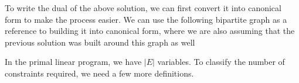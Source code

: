 \documentclass[addpoints]{exam}
\newcommand{\abs}[1]{\left| #1\right|}
\begin{document}
\begin{questions}
\begin{parts}
\begin{solution}
To write the dual of the above solution, we can first convert it into canonical form to make the process easier. We can use the following bipartite graph as a reference to building it into canonical form, where we are also assuming that the previous solution was built around this graph as well
\begin{center}
\end{center}

In the primal linear program, we have $\abs{E}$ variables. To classify the number of constraints required, we need a few more definitions.


\end{solution}
\end{parts}
\end{questions}
\end{document}
